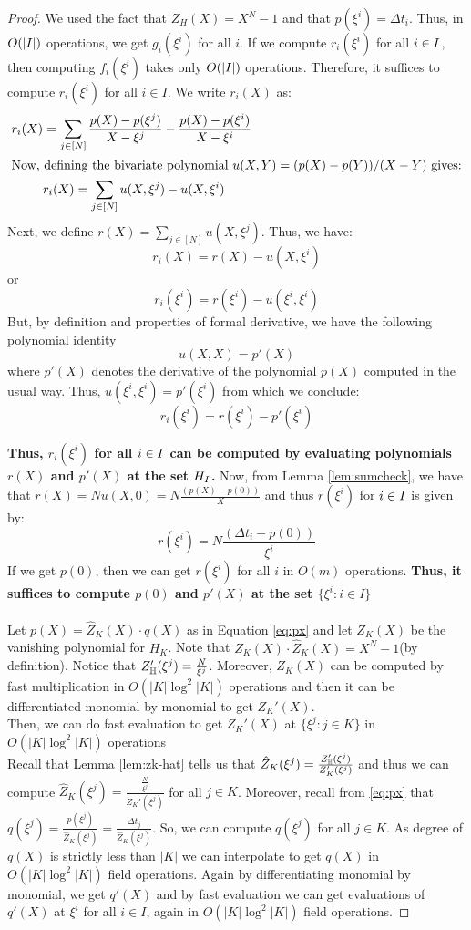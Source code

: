\begin{proof}
    We used the fact that $Z_H(X)=X^N-1$ and that $p(\xi^i)=\Delta t_i$.
    Thus, in $O(|I|)$ operations, we get $g_i(\xi^i)$ for all $i$.
    If we compute $r_i(\xi^i)$ for all $i \in I$, then computing $f_i(\xi^i)$ takes only
    $O(|I|)$ operations. Therefore, it suffices to compute $r_i(\xi^i)$ for all $i \in I$.
    We write $r_i(X)$ as:
    \begin{align}\label{eq:rx}
    r_i(X) &= \sum_{j\in [N]}\frac{p(X)-p(\xi^j)}{X-\xi^j} - \frac{p(X)-p(\xi^i)}{X-\xi^i} \nonumber \\
    \intertext{Now, defining the bivariate polynomial $u(X,Y)=(p(X) - p(Y))/(X-Y)$ gives:}
    &r_i(X)= \sum_{j\in [N]}u(X,\xi^j) - u(X,\xi^i) \nonumber
    \end{align}
    Next, we define $r(X)=\sum_{j\in [N]}u(X,\xi^j)$.
    Thus, we have:
    $$r_i(X)=r(X)-u(X, \xi^i)$$
    or
    $$r_i(\xi^i)=r(\xi^i) - u(\xi^i,\xi^i)$$
    But, by definition and properties of formal derivative, we have the following polynomial identity
    $$u(X, X)= p'(X)$$
    where $p'(X)$ denotes the derivative of the polynomial $p(X)$ computed in the usual way.
    Thus, $u(\xi^i, \xi^i)=p'(\xi^i)$ from which we conclude:
    $$r_i(\xi^i)=r(\xi^i) - p'(\xi^i) $$

    \textbf{Thus, $r_i(\xi^i)$ for all $i \in I$ can be computed by evaluating polynomials $r(X)$ and $p'(X)$ at the set $H_{I}$.}
    Now, from Lemma \ref{lem:sumcheck}, we have that $r(X)=N u(X,0)=N \frac{(p(X) - p(0))}{X}$ and thus $r(\xi^i)$ for $i\in I$ is given by:
    $$r(\xi^i)=N \frac{(\Delta t_i - p(0))}{\xi^i}$$
    If we get $p(0)$, then we can get $r(\xi^i)$ for all $i$ in $O(m)$ operations.
    \textbf{Thus, it suffices to compute $p(0)$ and $p'(X)$ at the set $\{\xi^i:i \in I\}$}\\\\
    Let $p(X)=\widehat{Z}_K(X)\cdot q(X)$
    as in Equation \eqref{eq:px} and let $Z_K(X)$ be the vanishing polynomial for $H_K$.
    Note that $Z_K(X) \cdot \hat{Z}_K(X)=X^N-1$(by definition).
    Notice that $Z_{\mathbb{H}}'(\xi^j)= \frac{N}{\xi^j} $.
    Moreover, $Z_K(X)$ can be computed by fast multiplication in $O(|K|\log^2 |K|)$ operations and then it can be differentiated monomial by monomial to get $Z_K'(X)$.\\
    Then, we can do fast evaluation to get $Z_K'(X)$ at $\{\xi^j:j\in K\}$ in $O(|K|\log^2 |K|)$ operations\\
    Recall that Lemma \ref{lem:zk-hat} tells us that $\hat{Z}_K(\xi^j)=\frac{Z_{\mathbb{H}}'(\xi^j)}{Z_K'(\xi^j)}$ and
     thus we can compute $\hat{Z}_K(\xi^j)=\frac{\frac{N}{\xi^j}}{Z_K'(\xi^j)}$ for all $j \in K$.
     Moreover, recall from \eqref{eq:px} that $q(\xi^j)=\frac{p(\xi^j)}{\hat{Z}_K(\xi^j)}=\frac{\Delta t_j}{\widehat{Z}_K(\xi^j)}$.
    So, we can compute $q(\xi^j)$ for all $j \in K$.
    As degree of $q(X)$ is strictly less than $|K|$ we can interpolate to get $q(X)$ in $O(|K|\log^2 |K|)$ field operations.
    Again by differentiating monomial by monomial, we get $q'(X)$ and by fast evaluation we can get evaluations of $q'(X)$ at $\xi^i$ for all $i \in I$, again in $O(|K|\log^2 |K|)$ field operations.


\end{proof}
